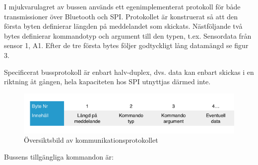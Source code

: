 \documentclass[a4paper,12pt,fleqn]{article}
\begin{document}
I mjukvarulagret av bussen används ett egenimplementerat protokoll för både transmissioner över Bluetooth och SPI. Protokollet är konstruerat så att den första byten definierar längden på meddelandet som skickats. Nästföljande två bytes definierar kommandotyp och argument till den typen, t.ex. Sensordata från sensor 1, A1.
Efter de tre första bytes följer godtyckligt lång datamängd se figur 3. 

Specificerat bussprotokoll är enbart halv-duplex, dvs. data kan enbart skickas i en riktning åt gången, hela kapaciteten hos SPI utnyttjas därmed inte. 

\begin{figure}[htp] %
  \begin{center}
  \includegraphics[keepaspectratio=true,scale=0.6]{bilder/Bussprotokoll.png}  %
  \end{center}
  \caption{Översiktsbild av kommunikationsprotokollet} %
  \label{fig:bussprotocol}
\end{figure}

Bussens tillgängliga kommandon är:
\end{document}
